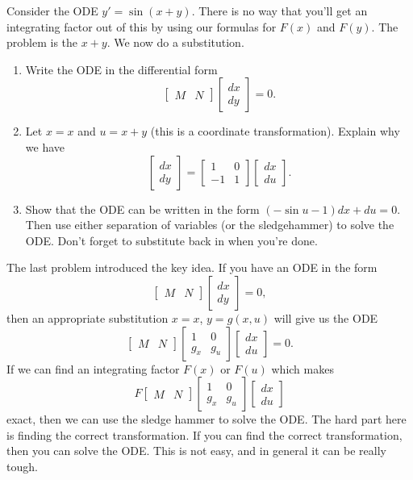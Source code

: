 \begin{problem}
 Consider the ODE $y'=\sin(x+y)$. There is no way that you'll get an integrating factor out of this by using our formulas for $F(x)$ and $F(y)$.  The problem is the $x+y$.  We now do a substitution.
\begin{enumerate}
 \item Write the ODE in the differential form $$\begin{bmatrix}M&N\end{bmatrix}\begin{bmatrix}dx\\dy\end{bmatrix}=0.$$
 \item Let $x=x$ and $u=x+y$ (this is a coordinate transformation). Explain why we have
$$\begin{bmatrix}dx\\dy\end{bmatrix}=\begin{bmatrix}1&0\\-1&1\end{bmatrix}\begin{bmatrix}dx\\du\end{bmatrix}.$$
 \item Show that the ODE can be written in the form $(-\sin u - 1)dx+du=0$.  Then use either separation of variables (or the sledgehammer) to solve the ODE.  Don't forget to substitute back in when you're done.
\end{enumerate}
\end{problem}
  
The last problem introduced the key idea.  If you have an ODE in the form 
$$\begin{bmatrix}M&N\end{bmatrix}\begin{bmatrix}dx\\dy\end{bmatrix}=0,$$
then an appropriate substitution $x=x$, $y=g(x,u)$ will give us the ODE
$$\begin{bmatrix}M&N\end{bmatrix}\begin{bmatrix}1&0\\g_x&g_u\end{bmatrix}\begin{bmatrix}dx\\du\end{bmatrix}=0.$$
If we can find an integrating factor $F(x)$ or $F(u)$ which makes 
$$F\begin{bmatrix}M&N\end{bmatrix}\begin{bmatrix}1&0\\g_x&g_u\end{bmatrix}\begin{bmatrix}dx\\du\end{bmatrix}$$
exact, then we can use the sledge hammer to solve the ODE.  The hard part here is finding the correct transformation.  If you can find the correct transformation, then you can solve the ODE.  This is not easy, and in general it can be really tough. 


